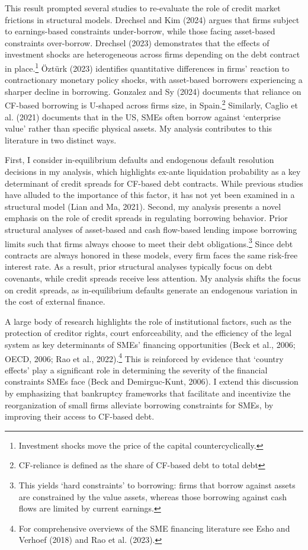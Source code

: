 \documentclass[12pt]{article}
\begin{document}
This result prompted several studies to re-evaluate the role of credit market frictions in structural models. Drechsel and Kim (2024) argues that firms subject to earnings-based constraints under-borrow, while those facing asset-based constraints over-borrow. Drechsel (2023) demonstrates that the effects of investment shocks are heterogeneous across firms depending on the debt contract in place.\footnote{Investment shocks move the price of the capital countercyclically.} Öztürk (2023) identifies quantitative differences in firms' reaction to contractionary monetary policy shocks, with asset-based borrowers experiencing a sharper decline in borrowing. Gonzalez and Sy (2024) documents that reliance on CF-based borrowing is U-shaped across firms size, in Spain.\footnote{CF-reliance is defined as the share of CF-based debt to total debt} Similarly, Caglio et al. (2021) documents that in the US, SMEs often borrow against `enterprise value' rather than specific physical assets. My analysis contributes to this literature in two distinct ways. 

First, I consider in-equilibrium defaults and endogenous default resolution decisions in my analysis, which highlights ex-ante liquidation probability as a key determinant of credit spreads for CF-based debt contracts. While previous studies have alluded to the importance of this factor, it has not yet been examined in a structural model (Lian and Ma, 2021). Second, my analysis presents a novel emphasis on the role of credit spreads in regulating borrowing behavior. Prior structural analyses of asset-based and cash flow-based lending impose borrowing limits such that firms always choose to meet their debt obligations.\footnote{This yields `hard constraints' to borrowing: firms that borrow against assets are constrained by the value assets, whereas those borrowing against cash flows are limited by current earnings.} Since debt contracts are always honored in these models, every firm faces the same risk-free interest rate. As a result, prior structural analyses typically focus on debt covenants, while credit spreads receive less attention. My analysis shifts the focus on credit spreads, as in-equilibrium defaults generate an endogenous variation in the cost of external finance. 

A large body of research highlights the role of institutional factors, such as the protection of creditor rights, court enforceability, and the efficiency of the legal system as key determinants of SMEs' financing opportunities (Beck et al., 2006; OECD, 2006; Rao et al., 2022).\footnote{For comprehensive overviews of the SME financing literature see Esho and Verhoef (2018) and Rao et al. (2023).} This is reinforced by evidence that `country effects' play a significant role in determining the severity of the financial constraints SMEs face (Beck and Demirguc-Kunt, 2006). I extend this discussion by emphasizing that bankruptcy frameworks that facilitate and incentivize the reorganization of small firms alleviate borrowing constraints for SMEs, by improving their access to CF-based debt. 
\end{document}
